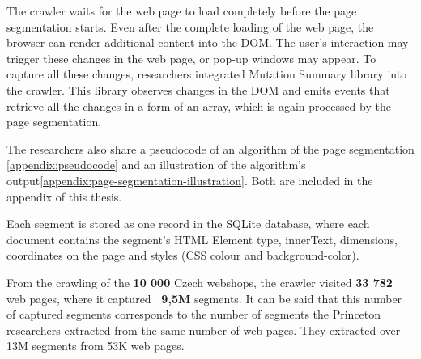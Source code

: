         The crawler waits for the web page to load completely before the page segmentation starts. Even after the complete loading of the web page, the browser can render additional content into the DOM. The user's interaction may trigger these changes in the web page, or pop-up windows may appear. To capture all these changes, researchers integrated Mutation Summary \cite{mutation-summary} library into the crawler. This library observes changes in the DOM and emits events that retrieve all the changes in a form of an array, which is again processed by the page segmentation.

        The researchers also share a pseudocode of an algorithm of the page segmentation \ref{appendix:pseudocode} and an illustration of the algorithm's output\ref{appendix:page-segmentation-illustration}. Both are included in the appendix of this thesis.

        Each segment is stored as one record in the SQLite database, where each document contains the segment's HTML Element type, innerText, dimensions, coordinates on the page and styles (CSS colour and background-color).

        From the crawling of the \textbf{10 000} Czech webshops, the crawler visited \textbf{33 782} web pages, where it captured \textbf{~9,5M} segments. It can be said that this number of captured segments corresponds to the number of segments the Princeton researchers extracted from the same number of web pages. They extracted over 13M segments from 53K web pages.
